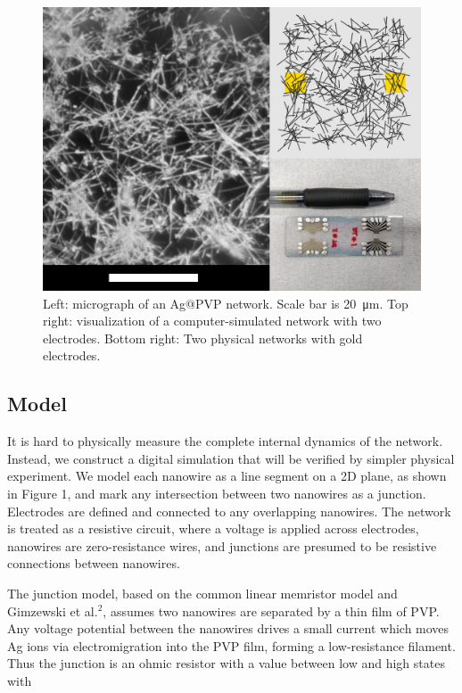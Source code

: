 \documentclass[twocolumn]{article}
\begin{document}
\begin{figure}[h]
\includegraphics[width=\columnwidth]{resources/micrograph.png}
\caption{Left: micrograph of an Ag@PVP network. Scale bar is \SI{20}{\micro\meter}. Top right: visualization of a computer-simulated network with two electrodes. Bottom right: Two physical networks with gold electrodes.}
\end{figure}

\subsection{Model}

It is hard to physically measure the complete internal dynamics of the network. Instead, we construct a digital simulation that will be verified by simpler physical experiment. We model each nanowire as a line segment on a 2D plane, as shown in Figure 1, and mark any intersection between two nanowires as a junction. Electrodes are defined and connected to any overlapping nanowires. The network is treated as a resistive circuit, where a voltage is applied across electrodes, nanowires are zero-resistance wires, and junctions are presumed to be resistive connections between nanowires.

The junction model, based on the common linear memristor model and Gimzewski et al.$^2$, assumes two nanowires are separated by a thin film of PVP. Any voltage potential between the nanowires drives a small current which moves Ag ions via electromigration into the PVP film, forming a low-resistance filament. Thus the junction is an ohmic resistor with a value between low and high states with
\end{document}
